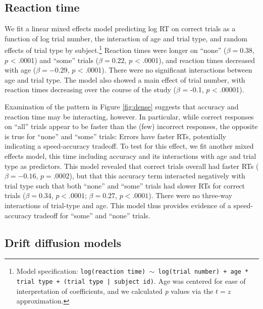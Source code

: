 \documentclass[10pt, letterpaper]{article}
\begin{document}
\subsection{Reaction time}\label{reaction-time}

We fit a linear mixed effects model predicting log RT on correct trials
as a function of log trial number, the interaction of age and trial
type, and random effects of trial type by subject.\footnote{Model
  specification:
  \texttt{log(reaction time) $\sim$ log(trial number) + age * trial type + (trial type | subject id)}.
  Age was centered for ease of interpretation of coefficients, and we
  calculated \emph{p} values via the \(t=z\) approximation.} Reaction
times were longer on ``none'' (\(\beta = 0.38\), \(p\) \textless{}
.0001) and ``some'' trials (\(\beta = 0.22\), \(p\) \textless{} .0001),
and reaction times decreased with age (\(\beta = -0.29\), \(p\)
\textless{} .0001). There were no significant interactions between age
and trial type. The model also showed a main effect of trial number,
with reaction times decreasing over the course of the study (\(\beta\) =
-0.1, \(p\) \textless{} .00001).

Examination of the pattern in Figure \ref{fig:dense} suggests that
accuracy and reaction time may be interacting, however. In particular,
while correct responses on ``all'' trials appear to be faster than the
(few) incorrect responses, the opposite is true for ``none'' and
``some'' trials: Errors have faster RTs, potentially indicating a
speed-accuracy tradeoff. To test for this effect, we fit another mixed
effects model, this time including accuracy and its interactions with
age and trial type as predictors. This model revealed that correct
trials overall had faster RTs (\(\beta = -0.16\), \(p = .0002\)), but
that this accuracy term interacted negatively with trial type such that
both ``none'' and ``some'' trials had slower RTs for correct trials
(\(\beta = 0.34\), \(p < .0001\); \(\beta = 0.27\), \(p < .0001\)).
There were no three-way interactions of trial-type and age. This model
thus provides evidence of a speed-accuracy tradeoff for ``some'' and
``none'' trials.

\subsection{Drift diffusion models}\label{drift-diffusion-models}
\end{document}
